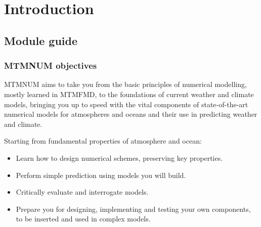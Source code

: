 \documentclass[11pt,fleqn]{book} %
\begin{document}
	
	\pagestyle{empty} %
	
	\renewcommand\contentsname{Table of Contents}
	\renewcommand{\bibname}{Bibliography}
	\tableofcontents%
	
	
	\pagestyle{fancy} %
	
	
\chapter{Introduction}
	
	\section{Module guide}
	\subsection{MTMNUM objectives}
	MTMNUM aims to take you from the basic principles of numerical modelling, mostly learned in MTMFMD, to the foundations of current weather and climate models, bringing you up to speed with the vital components of state-of-the-art numerical models for atmospheres and oceans and their use in predicting weather and climate.
	
	Starting from fundamental properties of atmosphere and ocean:
\begin{itemize}
\item	Learn how to design numerical schemes, preserving key properties.
\item	Perform simple prediction using models you will build.
\item	Critically evaluate and interrogate models.
\item	Prepare you for designing, implementing and testing your own components, to be inserted and used in complex models.
\end{itemize}
	
\end{document}
